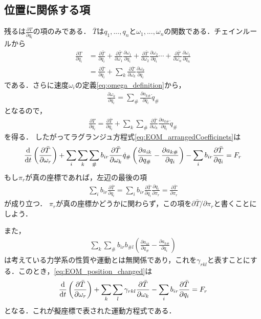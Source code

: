 \documentclass[a4j,10pt]{jsarticle}
\newcommand{\bbn}[2]{\frac{{\rm {\rm d}} #1}{{\rm {\rm d}} #2}}
\newcommand{\henbbn}[2]{\frac{\partial #1}{\partial #2}}
\begin{document}
\subsection*{位置に関係する項}
残るは$\henbbn{T}{q_i}$の項のみである．
$\bar{T}$は$q_1,...,q_n$と$\omega_1,...,\omega_n$の関数である．チェインルールから
\begin{align*}
    \henbbn{T}{q_i} &= \henbbn{\bar{T}}{q_i}+\henbbn{\bar{T}}{\omega_1}\henbbn{\omega_1}{q_i} + \henbbn{\bar{T}}{\omega_2}\henbbn{\omega_2}{q_i} \cdots +\henbbn{\bar{T}}{\omega_n}\henbbn{\omega_1}{q_n}\\
    &= \henbbn{\bar{T}}{q_i} + \sum_k \henbbn{\bar{T}}{\omega_k}\henbbn{\omega_k}{q_i}
\end{align*}
である．さらに速度$\omega_i$の定義\eqref{eq:omega_definition}から，
\begin{align*}
    \henbbn{\omega_k}{q_i}=
    \sum_\#\henbbn{a_{k\#}}{q_i}\dot{q}_\#
\end{align*}
となるので，
\begin{align*}
    \henbbn{T}{q_i} =\henbbn{\bar{T}}{q_i} + \sum_k \sum_\# \henbbn{\bar{T}}{\omega_k}\henbbn{a_{k\#}}{q_i}\dot{q}_\#
\end{align*}
を得る．
したがってラグランジュ方程式\eqref{eq:EOM_arrangedCoefficinets}は
\begin{align}
    \bbn{}{t}\left(\henbbn{\bar{T}}{\omega_r}\right)+\sum_i\sum_k\sum_\# b_{ir}\henbbn{\bar{T}}{\omega_k}\dot{q}_\# \left(\henbbn{a_{ik}}{q_\#} - \henbbn{a_{k\#}}{q_i}\right)-\sum_i b_{ir}\henbbn{\bar{T}}{q_i}=F_r
    \label{eq:EOM_position_changed}
\end{align}
もし$\pi_r$が真の座標であれば，左辺の最後の項
\begin{align*}
    \sum_i b_{ir}\henbbn{\bar{T}}{q_i} = \sum_i b_{ir}\henbbn{\bar{T}}{q_i}\henbbn{q_i}{\pi_r} = \henbbn{\bar{T}}{\pi_r}
\end{align*}
が成り立つ．
$\pi_r$が真の座標かどうかに関わらず，この項を$\partial{\bar{T}}/\partial{\pi_r}$と書くことにしよう．

また，
\begin{align}
    \sum_k\sum_\# b_{ir}b_{\# l} \left(\henbbn{a_{ik}}{q_\#} - \henbbn{a_{k\#}}{q_i}\right)
\end{align}
は考えている力学系の性質や運動とは無関係であり，これを$\gamma_{rkl}$と表すことにする．このとき，\eqref{eq:EOM_position_changed}は
\begin{align}
    \bbn{}{t}\left(\henbbn{\bar{T}}{\omega_r}\right)+\sum_k\sum_l \gamma_{rkl}\henbbn{\bar{T}}{\omega_k} - \sum_i b_{ir}\henbbn{\bar{T}}{q_i}=F_r
    \label{eq:EOM_quasiCoordinate}
\end{align}
となる．これが擬座標で表された運動方程式である．
\end{document}
